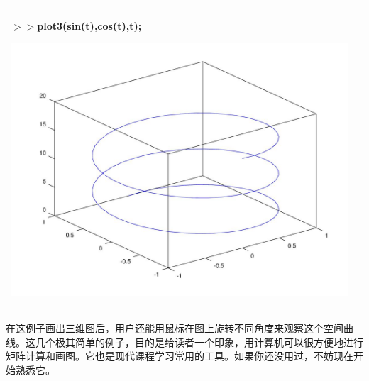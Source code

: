 \begin{table}[htbp]
\begin{tabular}{|p{170 pt}|p{170 pt}|}
	$ >> $plot3(sin(t),cos(t),t);
	
	\includegraphics[width = .4\textwidth]{pic/154013uf11jfijj1nivsjn.jpg}\\
	\hline
\end{tabular}

\vspace{1.5em}%
\end{table}
在这例子画出三维图后，用户还能用鼠标在图上旋转不同角度来观察这个空间曲线。这几个极其简单的例子，目的是给读者一个印象，用计算机可以很方便地进行矩阵计算和画图。它也是现代课程学习常用的工具。如果你还没用过，不妨现在开始熟悉它。

